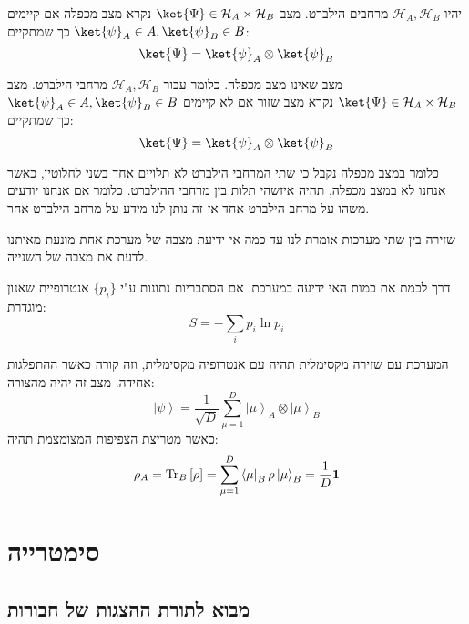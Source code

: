 \documentclass{tstextbook}
\begin{document}
\begin{definition}
יהיו \(\mathcal{H}_{A},\mathcal{H}_{B}\) מרחבים הילברט. מצב \(\ket{\Psi}\in \mathcal{H}_{A}\times \mathcal{H}_{B}\) נקרא מצב מכפלה אם קיימים \(\ket{\psi}_{A}\in A,\ket{\psi}_{B}\in B\) כך שמתקיים:
$$\ket{\Psi} =\ket{\psi} _{A}\otimes \ket{\psi} _{B}$$

\end{definition}
\begin{definition}
מצב שאינו מצב מכפלה. כלומר עבור \(\mathcal{H}_{A},\mathcal{H}_{B}\) מרחבי הילברט. מצב \(\ket{\Psi}\in \mathcal{H}_{A}\times \mathcal{H}_{B}\) נקרא מצב שזור אם לא קיימים \(\ket{\psi}_{A}\in A,\ket{\psi}_{B}\in B\) כך שמתקיים:
$$\ket{\Psi} =\ket{\psi} _{A}\otimes \ket{\psi} _{B}$$

\end{definition}
כלומר במצב מכפלה נקבל כי שתי המרחבי הילברט לא תלויים אחד בשני לחלוטין, כאשר אנחנו לא במצב מכפלה, תהיה איזשהי תלות בין מרחבי ההילברט. כלומר אם אנחנו יודעים משהו על מרחב הילברט אחד אז זה נותן לנו מידע על מרחב הילברט אחר.

\begin{definition}[שזירה]
שזירה בין שתי מערכות אומרת לנו עד כמה אי ידיעת מצבה של מערכת אחת מונעת מאיתנו לדעת את מצבה של השנייה.

\end{definition}
\begin{definition}
דרך לכמת את כמות האי ידיעה במערכת. אם הסתבריות נתונות ע"י \(\{ p_{i} \}\) אנטרופיית שאנון מוגדרת:
$$S=-\sum_{i}p_{i}\ln p_{i}$$

\end{definition}
\begin{proposition}
המערכת עם שזירה מקסימלית תהיה עם אנטרופיה מקסימלית, וזה קורה כאשר ההתפלגות אחידה. מצב זה יהיה מהצורה:
$$\left|\psi\right\rangle={\frac{1}{\sqrt{D}}}{\sum_{\mu=1}^{D}{\left|\mu\right\rangle}_{A}\otimes{\left|\mu\right\rangle}_{B}}$$
כאשר מטריצת הצפיפות המצומצמת תהיה:
$$\rho_{A}=\mathrm{Tr}_{B}\left[\rho\right]=\sum_{\mu=1}^{D}\left\langle\mu\right|_{B}\rho\left|\mu\right\rangle_{B}=\frac{1}{D}{\bf1}$$

\end{proposition}
\section{סימטרייה}

\subsection{מבוא לתורת ההצגות של חבורות}
\end{document}
